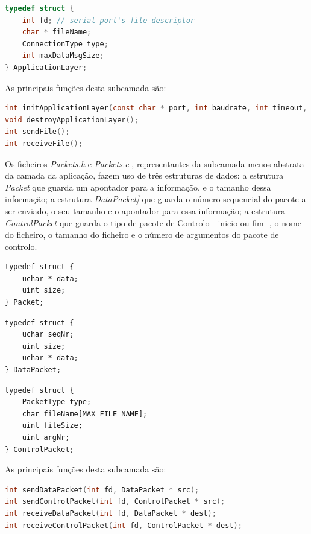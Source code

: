 \documentclass[a4paper, 11pt]{article}
\begin{document}
\begin{lstlisting}[language=C]
typedef struct {
    int fd; // serial port's file descriptor
    char * fileName;
    ConnectionType type;
    int maxDataMsgSize;
} ApplicationLayer;
\end{lstlisting}

As principais funções desta subcamada são:

\begin{lstlisting}[language=C]
int initApplicationLayer(const char * port, int baudrate, int timeout, int numRetries, ConnectionType type, int maxDataMsgSize, char * file);
void destroyApplicationLayer();
int sendFile();
int receiveFile();
\end{lstlisting}

Os ficheiros \textit{Packets.h} e \textit{Packets.c} , representantes da subcamada menos abstrata da camada da aplicação, fazem uso de três estruturas de dados: a estrutura \textit{Packet} que guarda um apontador para a informação, e o tamanho dessa informação; a estrutura \textit{DataPacket]} que guarda o número sequencial do pacote a ser enviado, o seu tamanho e o apontador para essa informação; a estrutura \textit{ControlPacket} que guarda o tipo de pacote de Controlo - inicio ou fim -, o nome do ficheiro, o tamanho do ficheiro e o número de argumentos do pacote de controlo.

\noindent\begin{minipage}{.22\textwidth}
\begin{lstlisting}[frame=tlrb]
typedef struct {
    uchar * data;
    uint size;
} Packet;
\end{lstlisting}
\end{minipage}\hfill
\begin{minipage}{.22\textwidth}
\begin{lstlisting}[frame=tlrb]
typedef struct {
    uchar seqNr;
    uint size;
    uchar * data;
} DataPacket;
\end{lstlisting}
\end{minipage}\hfill
\begin{minipage}{.4\textwidth}
\begin{lstlisting}[frame=tlrb]
typedef struct {
    PacketType type;
    char fileName[MAX_FILE_NAME];
    uint fileSize;
    uint argNr;
} ControlPacket;
\end{lstlisting}
\end{minipage}

As principais funções desta subcamada são:

\begin{lstlisting}[language=C]
int sendDataPacket(int fd, DataPacket * src);
int sendControlPacket(int fd, ControlPacket * src);
int receiveDataPacket(int fd, DataPacket * dest);
int receiveControlPacket(int fd, ControlPacket * dest);
\end{lstlisting}
\end{document}
